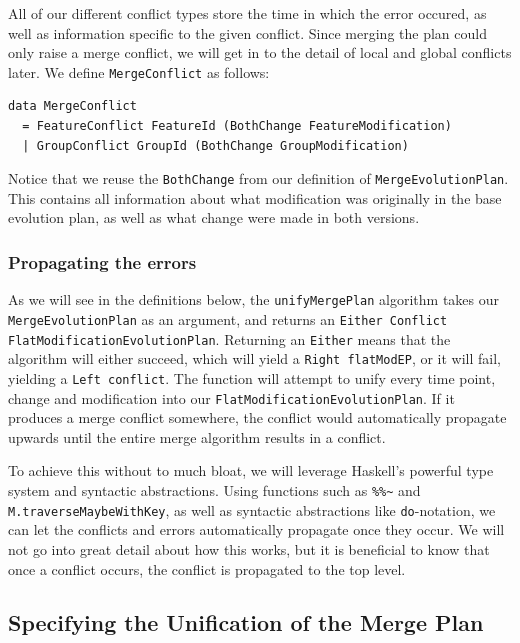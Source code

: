 \documentclass[a4paper,english]{ifimaster}
\begin{document}
All of our different conflict types store the time in which the error occured, as well as information specific to the given conflict. Since merging the plan could only raise a merge conflict, we will get in to the detail of local and global conflicts later. We define \texttt{MergeConflict} as follows:

\begin{verbatim}
data MergeConflict
  = FeatureConflict FeatureId (BothChange FeatureModification)
  | GroupConflict GroupId (BothChange GroupModification)
\end{verbatim}

Notice that we reuse the \texttt{BothChange} from our definition of \texttt{MergeEvolutionPlan}. This contains all information about what modification was originally in the base evolution plan, as well as what change were made in both versions.

\subsubsection{Propagating the errors}%
\label{ssub:propagating_the_errors}

As we will see in the definitions below, the \texttt{unifyMergePlan} algorithm takes our \texttt{MergeEvolutionPlan} as an argument, and returns an \texttt{Either Conflict FlatModificationEvolutionPlan}. Returning an \texttt{Either} means that the algorithm will either succeed, which will yield a \texttt{Right flatModEP}, or it will fail, yielding a \texttt{Left conflict}. The function will attempt to unify every time point, change and modification into our \texttt{FlatModificationEvolutionPlan}. If it produces a merge conflict somewhere, the conflict would automatically propagate upwards until the entire merge algorithm results in a conflict.

To achieve this without to much bloat, we will leverage Haskell's powerful type system and syntactic abstractions. Using functions such as \texttt{\%\%\~} and \texttt{M.traverseMaybeWithKey}, as well as syntactic abstractions like \texttt{do}-notation, we can let the conflicts and errors automatically propagate once they occur. We will not go into great detail about how this works, but it is beneficial to know that once a conflict occurs, the conflict is propagated to the top level.

\subsection{Specifying the Unification of the Merge Plan}%
\label{sub:specifying_the_unification_of_the_merge_plan}
\end{document}
